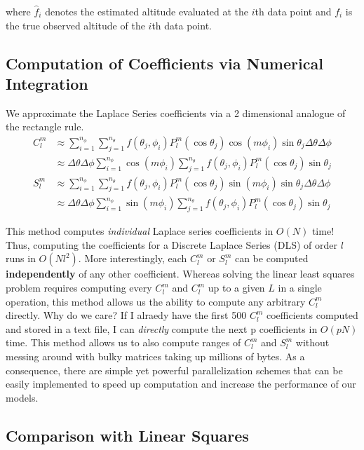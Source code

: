 \documentclass[a4paper]{article}
\theoremstyle{definition}
\begin{document}
where $\hat f_i$ denotes the estimated altitude evaluated at the $i$th data point and $f_i$ is the true observed altitude of the $i$th data point.


\subsection{Computation of Coefficients via Numerical Integration}


    
We approximate the Laplace Series coefficients via a 2 dimensional analogue of the rectangle rule.  
\begin{align*}
    C_l^m &\approx \sum_{i = 1}^{n_\phi}\sum_{j = 1}^{n_\theta} f(\theta_j, \phi_i) P_l^m (\cos \theta_j)\cos (m \phi_i) \sin \theta_j \Delta\theta \Delta\phi\\
          &\approx \Delta\theta \Delta\phi\sum_{i = 1}^{n_\phi}\cos (m \phi_i)\sum_{j = 1}^{n_\theta} f(\theta_j, \phi_i) P_l^m (\cos \theta_j) \sin \theta_j\\
    S_l^m &\approx \sum_{i = 1}^{n_\phi}\sum_{j = 1}^{n_\theta} f(\theta_j, \phi_i) P_l^m (\cos \theta_j)\sin (m \phi_i) \sin \theta_j \Delta\theta \Delta\phi\\
          &\approx \Delta\theta \Delta\phi\sum_{i = 1}^{n_\phi}\sin (m \phi_i)\sum_{j = 1}^{n_\theta} f(\theta_j, \phi_i) P_l^m (\cos \theta_j) \sin \theta_j
\end{align*}

This method computes \textit{individual} Laplace series coefficients in $O(N)$ time! Thus, computing the coefficients for a Discrete Laplace Series (DLS) of order $l$ runs in
$O(Nl^2)$. More interestingly, each $C_l^m$ or $S_l^m$ can be computed \textbf{independently} of any other coefficient. Whereas solving the linear least squares problem requires computing
every $C_l^m$ and $C_l^m$ up to a given $L$ in a single operation, this method allows us the ability to compute any arbitrary $C_l^m$ directly. Why do we care? If I alraedy have the first 500 $C_l^m$ coefficients computed
and stored in a text file, I can \textit{directly} compute the next p coefficients in $O(pN)$ time. This method allows us to also compute ranges of $C_l^m$ and $S_l^m$ without messing around
with bulky matrices taking up millions of bytes. As a consequence, there are simple yet powerful parallelization schemes that can be easily implemented to speed up computation and increase 
the performance of our models.

\subsection{Comparison with Linear Squares}
\end{document}
